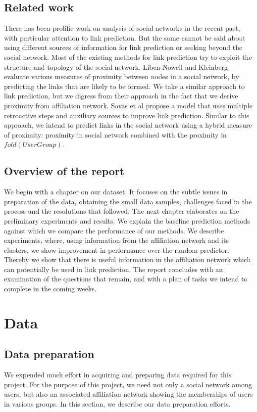 \documentclass{report}
\begin{document}
\section{Related work}
There has been prolific work on analysis of social networks in the recent past, with particular attention to link prediction. But the same cannot be said about using different sources of information for link prediction or seeking beyond the social network. Most of the existing methods for link prediction try to exploit the structure and topology of the social network. Liben-Nowell and Kleinberg\cite{kleinberg} evaluate various measures of proximity between nodes in a social network, by predicting the links that are likely to be formed. We take a similar approach to link prediction, but we digress from their approach in the fact that we derive proximity from affiliation network. Savas et al propose a model\cite{savasLinkPred} that uses multiple retroactive steps and auxiliary sources to improve link prediction. Similar to this approach, we intend to predict links in the social network using a hybrid measure of proximity: proximity in social network combined with the proximity in $fold(UserGroup)$.

\section{Overview of the report}
We begin with a chapter on our dataset. It focuses on the subtle issues in preparation of the data, obtaining the small data samples, challenges faced in the process and the resolutions that followed. The next chapter elaborates on the preliminary experiments and results. We explain the baseline prediction methods against which we compare the performance of our methods. We describe experiments, where, using information from the affiliation network and its clusters, we show improvement in performance over the random predictor. Thereby we show that there is useful information in the affiliation network which can potentially be used in link prediction. The report concludes with an examination of the questions that remain, and with a plan of tasks we intend to complete in the coming weeks.

\chapter{Data}
\section{Data preparation}
We expended much effort in acquiring and preparing data required for this project. For the purpose of this project, we need not only a social network among users, but also an associated affiliation network showing the memberships of users in various groups. In this section, we describe our data preparation efforts.
\end{document}
